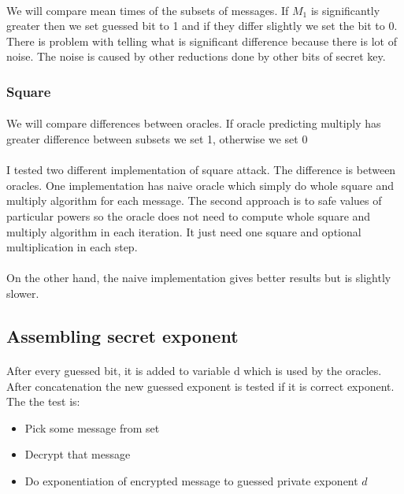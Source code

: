 \documentclass[thesis=B,english]{FITthesis}[2012/10/20]
\begin{document}
\paragraph*{}{
We will compare mean times of the subsets of messages. If \(M_1\) is significantly greater then we set guessed bit to 1 and if they differ slightly we set the bit to 0. There is problem with telling what is significant difference because there is lot of noise. The noise is caused by other reductions done by other bits of secret key.

}

\subsubsection{Square}
\paragraph*{}{
We will compare differences between oracles. If oracle predicting multiply has greater difference between subsets we set 1, otherwise we set 0
}

\paragraph*{}
{I tested two different implementation of square attack. The difference is between oracles. One implementation has naive oracle which simply do whole square and multiply algorithm 
for each message. The second approach is to safe values of particular powers so the oracle does not need to compute whole square and multiply algorithm in each iteration. It just need
one square and optional multiplication in each step.
}

\paragraph*{}{
On the other hand, the naive implementation gives better results but is slightly slower.
}

\subsection{Assembling secret exponent}
\paragraph*{}{
After every guessed bit, it is added to variable d which is used by the oracles. After concatenation the new guessed exponent is tested if it is correct exponent.
The the test is:}
\begin{itemize}
 \item Pick some message from set
 \item Decrypt that message
 \item Do exponentiation of encrypted message to guessed private exponent \(d\)
\end{itemize}
\end{document}
